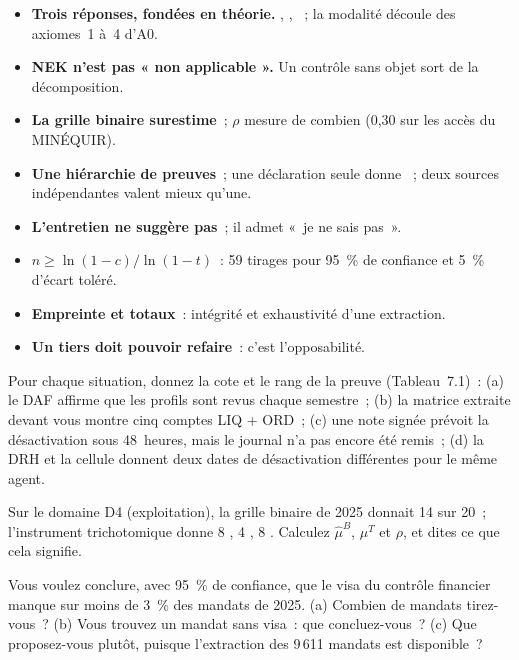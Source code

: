 \separateur

\begin{boxresume}
\begin{itemize}
    \item \textbf{Trois réponses, fondées en théorie.} \OUI{}, \NON{}, \NEK{}~;
          la modalité \NEK{} découle des axiomes~1 à~4 d'A0.
    \item \textbf{NEK n'est pas « non applicable ».} Un contrôle sans objet
          sort de la décomposition.
    \item \textbf{La grille binaire surestime}~; $\rho$ mesure de combien
          (0,30 sur les accès du MINÉQUIR).
    \item \textbf{Une hiérarchie de preuves}~; une déclaration seule donne
          \NEK{}~; deux sources indépendantes valent mieux qu'une.
    \item \textbf{L'entretien ne suggère pas}~; il admet «~je ne sais pas~».
    \item \textbf{$n \ge \ln(1-c) / \ln(1-t)$}~: 59 tirages pour 95~\% de
          confiance et 5~\% d'écart toléré.
    \item \textbf{Empreinte et totaux}~: intégrité et exhaustivité d'une
          extraction.
    \item \textbf{Un tiers doit pouvoir refaire}~: c'est l'opposabilité.
\end{itemize}
\end{boxresume}

\begin{boxexo}[title={\ding{45}\quad Exercice~7.1. Coter avec la bonne preuve \niveaubase}]
Pour chaque situation, donnez la cote et le rang de la preuve
(Tableau~7.1)~: (a) le DAF affirme que les profils sont revus chaque
semestre~; (b) la matrice extraite devant vous montre cinq comptes LIQ +
ORD~; (c) une note signée prévoit la désactivation sous 48~heures, mais le
journal n'a pas encore été remis~; (d) la DRH et la cellule donnent deux
dates de désactivation différentes pour le même agent.
\end{boxexo}

\begin{boxexo}[title={\ding{45}\quad Exercice~7.2. L'indice $\rho$ \niveaubase}]
Sur le domaine D4 (exploitation), la grille binaire de 2025 donnait 14
\OUI{} sur 20~; l'instrument trichotomique donne 8 \OUI{}, 4 \NON{}, 8
\NEK{}. Calculez $\hat{\mu}^{B}$, $\mu^{T}$ et $\rho$, et dites ce que cela
signifie.
\end{boxexo}

\begin{boxexo}[title={\ding{45}\quad Exercice~7.3. Dimensionner \niveaumoyen}]
Vous voulez conclure, avec 95~\% de confiance, que le visa du contrôle
financier manque sur moins de 3~\% des mandats de 2025. (a) Combien de
mandats tirez-vous~? (b) Vous trouvez un mandat sans visa~: que
concluez-vous~? (c) Que proposez-vous plutôt, puisque l'extraction des
9\,611 mandats est disponible~?
\end{boxexo}

